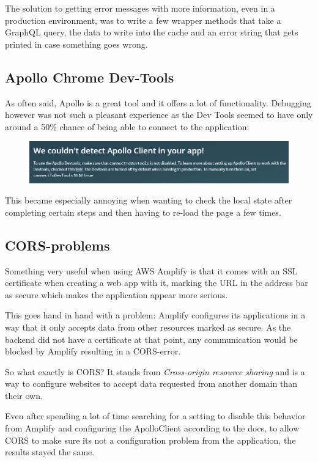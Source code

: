 The solution to getting error messages with more information, even in a production environment, was to write a few wrapper methods that take a GraphQL query, the data to write into the cache and an error string that gets printed in case something goes wrong.

\subsection{Apollo Chrome Dev-Tools}
As often said, Apollo is a great tool and it offers a lot of functionality. Debugging however was not such a pleasant experience as the Dev Tools seemed to have only around a 50\% chance of being able to connect to the application:
\begin{figure}[H]
\centering
\includegraphics[scale=.65]{Bilder/ScreenOfDeath.png}
\end{figure}
This became especially annoying when wanting to check the local state after completing certain steps and then having to re-load the page a few times.

\subsection{CORS-problems}
Something very useful when using AWS Amplify is that it comes with an SSL certificate when creating a web app with it, marking the URL in the address bar as secure which makes the application appear more serious.

This goes hand in hand with a problem: Amplify configures its applications in a way that it only accepts data from other resources marked as secure. As the backend did not have a certificate at that point, any communication would be blocked by Amplify resulting in a CORS-error.

So what exactly is CORS? It stands from \emph{Cross-origin resource sharing} and is a way to configure websites to accept data requested from another domain than their own.

Even after spending a lot of time searching for a setting to disable this behavior from Amplify and configuring the ApolloClient according to the docs, to allow CORS to make sure its not a configuration problem from the application, the results stayed the same.

